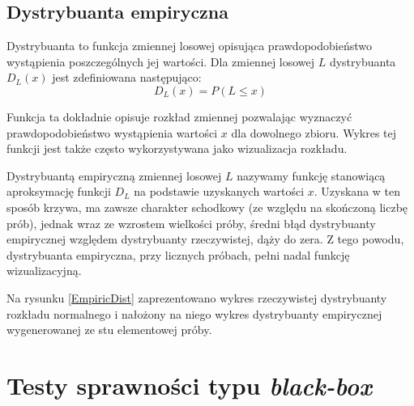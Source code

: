 \documentclass[12pt,a4paper]{report}
\begin{document}
{{{{{\subsection{Dystrybuanta empiryczna}
\par{
Dystrybuanta to funkcja zmiennej losowej opisująca prawdopodobieństwo wystąpienia poszczególnych jej wartości. Dla zmiennej losowej $L$ dystrybuanta $D_L(x)$ jest zdefiniowana następująco:
\begin{equation}
D_L(x) = P(L \le x)
\end{equation}
}
\par{
Funkcja ta dokładnie opisuje rozkład zmiennej pozwalając wyznaczyć prawdopodobieństwo wystąpienia wartości $x$ dla dowolnego zbioru. Wykres tej funkcji jest także często wykorzystywana jako wizualizacja rozkładu.
}
\par{
Dystrybuantą empiryczną zmiennej losowej $L$ nazywamy funkcję stanowiącą aproksymację funkcji $D_L$ na podstawie uzyskanych wartości $x$. Uzyskana w ten sposób krzywa, ma zawsze charakter schodkowy (ze względu na skończoną liczbę prób), jednak wraz ze wzrostem wielkości próby, średni błąd dystrybuanty empirycznej względem dystrybuanty rzeczywistej, dąży do zera. Z tego powodu, dystrybuanta empiryczna, przy licznych próbach, pełni nadal funkcję wizualizacyjną.
}
\par{
Na rysunku \ref{EmpiricDist} zaprezentowano wykres rzeczywistej dystrybuanty rozkładu normalnego i nałożony na niego wykres dystrybuanty empirycznej wygenerowanej ze stu elementowej próby.
}

\section{Testy sprawności typu \emph{black-box}}
\label{benchmarkChapter}
}}}}}
\end{document}
